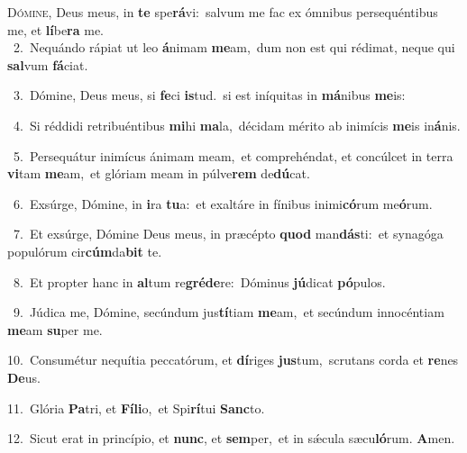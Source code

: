 \lettrine{\initial\textcolor{\initialcolor}{D}}{ómine,} Deus meus, in \textbf{te} spe\-\textbf{rá}\-vi:~\star salvum me fac ex ómnibus persequéntibus me, et \textbf{lí}\-be\textbf{ra} me.\\
{\numbfont\textcolor{\numbcolor}{~2.}}~Nequándo rápiat ut leo \textbf{á}\-nimam \textbf{me}\-am,~\star dum non est qui rédimat, neque qui \textbf{sal}\-vum \textbf{fá}\-ciat.\par
{\numbfont\textcolor{\numbcolor}{~3.}}~Dómine, Deus meus, si \textbf{fe}\-ci \textbf{is}\-tud.~\star si est iníquitas in \textbf{má}\-nibus \textbf{me}\-is:\par
{\numbfont\textcolor{\numbcolor}{~4.}}~Si réddidi retribuéntibus \textbf{mi}\-hi \textbf{ma}\-la,~\star décidam mérito ab inimícis \textbf{me}\-is in\-\textbf{á}\-nis.\par
{\numbfont\textcolor{\numbcolor}{~5.}}~Persequátur inimícus ánimam meam,~\dagger et comprehéndat, et concúlcet in terra \textbf{vi}\-tam \textbf{me}\-am,~\star et glóriam meam in púlve\textbf{rem} de\-\textbf{dú}\-cat.\par
{\numbfont\textcolor{\numbcolor}{~6.}}~Exsúrge, Dómine, in \textbf{i}\-ra \textbf{tu}\-a:~\star et exaltáre in fínibus inimi\-\textbf{có}\-rum me\-\textbf{ó}\-rum.\par
{\numbfont\textcolor{\numbcolor}{~7.}}~Et exsúrge, Dómine Deus meus, in præcépto \textbf{quod} man\-\textbf{dás}\-ti:~\star et synagóga populórum cir\-\textbf{cúm}\-da\textbf{bit} te.\par
{\numbfont\textcolor{\numbcolor}{~8.}}~Et propter hanc in \textbf{al}\-tum re\-\textbf{gré}\-\textbf{de}re:~\star Dóminus \textbf{jú}\-dicat \textbf{pó}\-pulos.\par
{\numbfont\textcolor{\numbcolor}{~9.}}~Júdica me, Dómine, secúndum jus\-\textbf{tí}\-tiam \textbf{me}\-am,~\star et secúndum innocéntiam \textbf{me}\-am \textbf{su}\-per me.\par
{\numbfont\textcolor{\numbcolor}{10.}}~Consumétur nequítia peccatórum, et \textbf{dí}\-riges \textbf{jus}\-tum,~\star scrutans corda et \textbf{re}\-nes \textbf{De}\-us.\par
{\numbfont\textcolor{\numbcolor}{11.}}~Glória \textbf{Pa}\-tri, et \textbf{Fí}\-\textbf{li}o,~\star et Spi\-\textbf{rí}\-tui \textbf{Sanc}\-to.\par
{\numbfont\textcolor{\numbcolor}{12.}}~Sicut erat in princípio, et \textbf{nunc}\-, et \textbf{sem}\-per,~\star et in sǽcula sæcu\-\textbf{ló}\-rum. \textbf{A}\-men.\par
